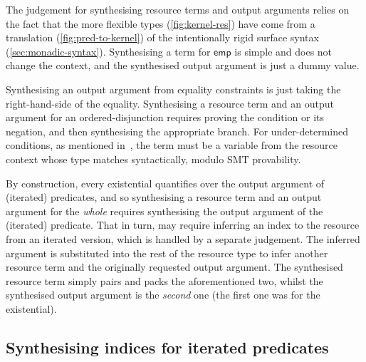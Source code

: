 The judgement for synthesising resource terms and output arguments relies on
the fact that the more flexible  types (\cref{fig:kernel-res})
have come from a translation (\cref{fig:pred-to-kernel}) of the intentionally
rigid surface syntax (\cref{sec:monadic-syntax}). Synthesising a term for
$\mathsf{emp}$ is simple and does not change the context, and the synthesised
output argument is just a dummy value.

Synthesising an output argument from equality constraints is just taking the right-hand-side of the
equality. Synthesising a resource term and an output argument for an
ordered-disjunction requires proving the condition or its negation, and then
synthesising the appropriate branch. For under-determined conditions, as
mentioned in~, the term must be a variable
from the resource context whose type matches syntactically, modulo SMT
provability.

By construction, every existential quantifies over the output argument of
(iterated) predicates, and so synthesising a resource term and an output
argument for the \emph{whole} requires synthesising the output argument of the
(iterated) predicate. That in turn, may require inferring an index to the
resource from an iterated version, which is handled by a separate judgement.
The inferred argument is substituted into the rest of the resource type to
infer another resource term and the originally requested output argument. The
synthesised resource term simply pairs and packs the aforementioned two, whilst
the synthesised output argument is the \emph{second} one (the first one was for
the existential).

\subsection{Synthesising indices for iterated predicates}\label{subsec:synth-indices}


